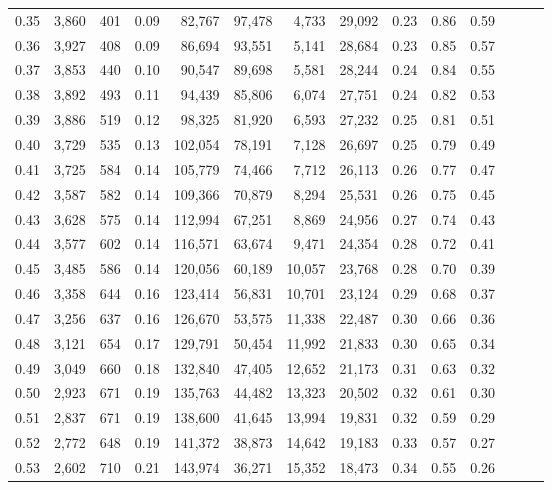 \begin{tabular}{rrrrrrrrrrrrrr}
0.35 &  3,860 &  401 &  0.09 &   82,767 &   97,478 &   4,733 &  29,092 &  0.23 &  0.86 &      0.59 \\
0.36 &  3,927 &  408 &  0.09 &   86,694 &   93,551 &   5,141 &  28,684 &  0.23 &  0.85 &      0.57 \\
0.37 &  3,853 &  440 &  0.10 &   90,547 &   89,698 &   5,581 &  28,244 &  0.24 &  0.84 &      0.55 \\
0.38 &  3,892 &  493 &  0.11 &   94,439 &   85,806 &   6,074 &  27,751 &  0.24 &  0.82 &      0.53 \\
0.39 &  3,886 &  519 &  0.12 &   98,325 &   81,920 &   6,593 &  27,232 &  0.25 &  0.81 &      0.51 \\
0.40 &  3,729 &  535 &  0.13 &  102,054 &   78,191 &   7,128 &  26,697 &  0.25 &  0.79 &      0.49 \\
0.41 &  3,725 &  584 &  0.14 &  105,779 &   74,466 &   7,712 &  26,113 &  0.26 &  0.77 &      0.47 \\
0.42 &  3,587 &  582 &  0.14 &  109,366 &   70,879 &   8,294 &  25,531 &  0.26 &  0.75 &      0.45 \\
0.43 &  3,628 &  575 &  0.14 &  112,994 &   67,251 &   8,869 &  24,956 &  0.27 &  0.74 &      0.43 \\
0.44 &  3,577 &  602 &  0.14 &  116,571 &   63,674 &   9,471 &  24,354 &  0.28 &  0.72 &      0.41 \\
0.45 &  3,485 &  586 &  0.14 &  120,056 &   60,189 &  10,057 &  23,768 &  0.28 &  0.70 &      0.39 \\
0.46 &  3,358 &  644 &  0.16 &  123,414 &   56,831 &  10,701 &  23,124 &  0.29 &  0.68 &      0.37 \\
0.47 &  3,256 &  637 &  0.16 &  126,670 &   53,575 &  11,338 &  22,487 &  0.30 &  0.66 &      0.36 \\
0.48 &  3,121 &  654 &  0.17 &  129,791 &   50,454 &  11,992 &  21,833 &  0.30 &  0.65 &      0.34 \\
0.49 &  3,049 &  660 &  0.18 &  132,840 &   47,405 &  12,652 &  21,173 &  0.31 &  0.63 &      0.32 \\
0.50 &  2,923 &  671 &  0.19 &  135,763 &   44,482 &  13,323 &  20,502 &  0.32 &  0.61 &      0.30 \\
0.51 &  2,837 &  671 &  0.19 &  138,600 &   41,645 &  13,994 &  19,831 &  0.32 &  0.59 &      0.29 \\
0.52 &  2,772 &  648 &  0.19 &  141,372 &   38,873 &  14,642 &  19,183 &  0.33 &  0.57 &      0.27 \\
0.53 &  2,602 &  710 &  0.21 &  143,974 &   36,271 &  15,352 &  18,473 &  0.34 &  0.55 &      0.26 \\

\end{tabular}
